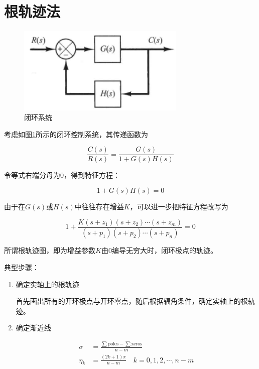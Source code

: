 \section{根轨迹法}

\begin{figure}[!ht]
    \centering
    \includegraphics[width=8cm]{figures/20.png}
    \caption{闭环系统}
    \label{20}
\end{figure}

考虑如图\ref{20}所示的闭环控制系统，其传递函数为

\begin{equation*}
    \frac{C(s)}{R(s)}=\frac{G(s)}{1+G(s) H(s)}
\end{equation*}

令等式右端分母为$0$，得到特征方程：

\begin{equation*}
    1+G(s) H(s)=0
\end{equation*}

由于在$G(s)$或$H(s)$中往往存在增益$K$，可以进一步把特征方程改写为

\begin{equation*}
    1+\frac{K\left(s+z_{1}\right)\left(s+z_{2}\right) \cdots\left(s+z_{m}\right)}{\left(s+p_{1}\right)\left(s+p_{2}\right) \cdots\left(s+p_{n}\right)}=0
\end{equation*}

所谓根轨迹图，即为增益参数$K$由0编导无穷大时，闭环极点的轨迹。

典型步骤：

\begin{enumerate}
    \item 确定实轴上的根轨迹
    
    首先画出所有的开环极点与开环零点，随后根据辐角条件，确定实轴上的根轨迹。

    \item 确定渐近线
    
    \begin{align*}
        \sigma&=\frac{\sum\mbox{poles}-\sum\mbox{zeros}}{n-m}\\
        \eta_k&=\frac{(2k+1)\pi}{n-m}\quad k=0,1,2,\cdots ,n-m
    \end{align*}
\end{enumerate}